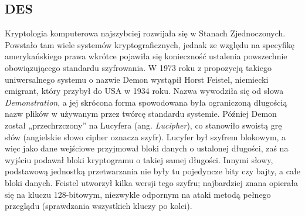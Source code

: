 \documentclass[a4paper]{article}
\begin{document}
\subsection{DES}
Kryptologia komputerowa najszybciej rozwijała się w Stanach Zjednoczonych. Powstało tam wiele
systemów kryptograficznych, jednak ze względu na specyfikę amerykańskiego prawa wkrótce pojawiła
się konieczność ustalenia powszechnie obowiązującego standardu szyfrowania. W 1973 roku
z propozycją takiego uniwersalnego systemu o nazwie Demon wystąpił Horst Feistel, niemiecki
emigrant, który przybył do USA w 1934 roku. Nazwa wywodziła się od słowa \textit{Demonstration}, a jej
skrócona forma spowodowana była ograniczoną długością nazw plików w używanym przez twórcę
standardu systemie. Później Demon został „przechrzczony” na Lucyfera (ang. \textit{Lucipher}), co stanowiło
swoistą grę słów (angielskie słowo cipher oznacza szyfr). Lucyfer był szyfrem blokowym, a
więc jako dane wejściowe przyjmował bloki danych o ustalonej długości, zaś na wyjściu podawał
bloki kryptogramu o takiej samej długości. Innymi słowy, podstawową jednostką przetwarzania
nie były tu pojedyncze bity czy bajty, a całe bloki danych. Feistel utworzył kilka wersji tego szyfru;
najbardziej znana opierała się na kluczu 128-bitowym, niezwykle odpornym na ataki metodą
pełnego przeglądu (sprawdzania wszystkich kluczy po kolei).
\end{document}
